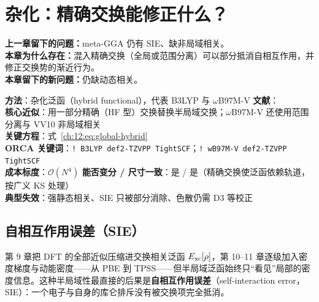 
\section{杂化：精确交换能修正什么？}
\label{ch:12:sec:title}

\begin{problemchain}
\textbf{上一章留下的问题：}meta-GGA 仍有 SIE、缺非局域相关。\\
\textbf{本章为什么存在：}混入精确交换（全局或范围分离）可以部分抵消自相互作用，并修正交换势的渐近行为。\\
\textbf{本章留下的新问题：}仍缺动态相关。
\end{problemchain}

\begin{methodcard}
\textbf{方法}：杂化泛函（hybrid functional），代表 B3LYP 与 $\omega$B97M-V\quad
\textbf{文献}：\citep{becke1993b3lyp,lee1988,adamo1999pbe0,mardirossian2016wb97mv}\\
\textbf{核心近似}：用一部分精确（HF 型）交换替换半局域交换；$\omega$B97M-V 还使用范围分离与 VV10 非局域相关\\
\textbf{关键方程}：式~\eqref{ch:12:eq:global-hybrid}\\
\textbf{ORCA 关键词}：\texttt{! B3LYP def2-TZVPP TightSCF}；\texttt{! wB97M-V def2-TZVPP TightSCF}\\
\textbf{成本标度}：$\mathcal{O}(N^4)$\quad
\textbf{能否变分 / 尺寸一致}：是 / 是（精确交换使泛函依赖轨道，按广义 KS 处理）\\
\textbf{典型失效}：强静态相关、SIE 只被部分消除、色散仍需 D3 等校正
\end{methodcard}

\subsection{自相互作用误差（SIE）}
\label{ch:12:sec:sie}

第 9 章把 DFT 的全部近似压缩进交换相关泛函 $E_{\mathrm{xc}}[\rho]$，第 10--11 章逐级加入密度梯度与动能密度——从 PBE\citep{perdew1996pbe} 到 TPSS\citep{tao2003}——但半局域泛函始终只“看见”局部的密度信息。这种半局域性最直接的后果是\textbf{自相互作用误差}（self-interaction error，SIE）：一个电子与自身的库仑排斥没有被交换项完全抵消\citep{perdew1981sie}。

